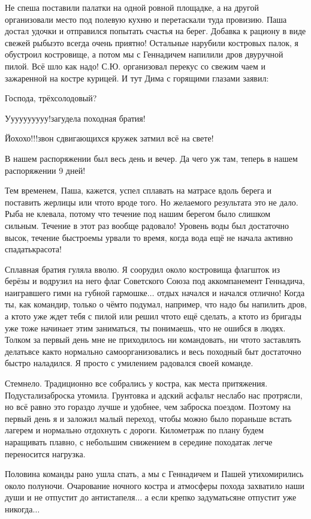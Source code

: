 Не спеша поставили палатки на одной ровной площадке, а на другой организовали место под полевую кухню и перетаскали туда провизию. Паша достал удочки и отправился попытать счастья на берег. Добавка к рациону в виде свежей рыбы\mdash это всегда очень приятно! Остальные нарубили костровых палок, я обустроил костровище, а потом мы с Геннадичем напилили дров двуручной пилой. Всё шло как надо! С.Ю. организовал перекус со свежим чаем и зажаренной на костре курицей. И тут Дима с горящими глазами заявил:

\diagdash Господа, трёхсолодовый?

\diagdash У\sdash у\sdash у\sdash у\sdash у\sdash у\sdash у\sdash у\sdash у\sdash у!\mdash загудела походная братия! 

\diagdash Йо\sdash хо\sdash хо!!!\mdash звон сдвигающихся кружек затмил всё на свете! 

В нашем распоряжении был весь день и вечер. Да чего уж там, теперь в нашем распоряжении 9\thinspace\nbdash{} дней! 

Тем временем, Паша, кажется, успел сплавать на матрасе вдоль берега и поставить жерлицы или что\sdash то вроде того. Но желаемого результата это не дало. Рыба не клевала, потому что течение под нашим берегом было слишком сильным. Течение в этот раз вообще радовало! Уровень воды был достаточно высок, течение быстрое\mdash мы урвали то время, когда вода ещё не начала активно спадать\mdash кра\sdash со\sdash та!
 
Сплавная братия гуляла вволю. Я соорудил около костровища флагшток из берёзы и водрузил на него флаг Советского Союза под аккомпанемент Геннадича, наигравшего гимн на губной гармошке$\ldots$ отдых начался и начался отлично! Когда ты, как командир, только о чём\sdash то подумал, например, что надо бы напилить дров, а кто\sdash то уже ждет тебя с пилой или решил что\sdash то ещё сделать, а кто\sdash то из бригады уже тоже начинает этим заниматься, ты понимаешь, что не ошибся в людях. Толком за первый день мне не приходилось ни командовать, ни что\sdash то заставлять делать\mdash все как\sdash то нормально самоорганизовались и весь походный быт достаточно быстро наладился. Я просто с умилением радовался своей команде.

Стемнело. Традиционно все собрались у костра, как места притяжения. Подустали\mdash заброска утомила. Грунтовка и адский асфальт неслабо нас протрясли, но всё равно это гораздо лучше и удобнее, чем заброска поездом. Поэтому на первый день я и заложил малый переход, чтобы можно было пораньше встать лагерем и нормально отдохнуть с дороги. Километраж по плану будем наращивать плавно, с небольшим снижением в середине похода\mdash так легче переносится нагрузка.

Половина команды рано ушла спать, а мы с Геннадичем и Пашей утихомирились около полуночи. Очарование ночного костра и атмосферы похода захватило наши души и не отпустит до антистапеля$\ldots$ а если крепко задуматься\mdash не отпустит уже никогда$\ldots$

\begin{center}
\end{center}
